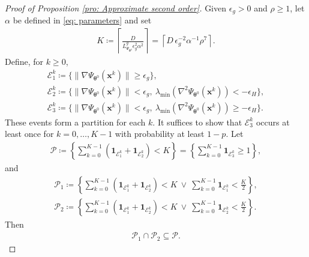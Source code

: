 \documentclass{siamart251216}
\begin{document}
\begin{proof}[Proof of Proposition \ref{pro: Approximate second order}]
    Given $\epsilon_g>0$ and $\rho\geq1$, let $\alpha$ be defined in \eqref{eq: parameters} and set
    \begin{gather}
        \label{eq: K}
        K\coloneqq
        \left\lceil
        \frac{D}{L_{\Psi_{\boldsymbol{\theta}^{0}}}^{g}\epsilon_g^{2}\alpha^{2}}
        \right\rceil
        =
        \left\lceil
        D\,\epsilon_g^{-2}\alpha^{-1}\rho^{7}
        \right\rceil .
    \end{gather}
    Define, for $k\geq0$,
    \begin{gather*}
        \mathcal{E}_{1}^{k}\coloneqq
        \{\|\nabla\Psi_{\boldsymbol{\theta}^{0}}(\mathbf{x}^{k})\|\geq\epsilon_g\},\\
        \mathcal{E}_{2}^{k}\coloneqq
        \{\|\nabla\Psi_{\boldsymbol{\theta}^{0}}(\mathbf{x}^{k})\|<\epsilon_g,\ 
        \lambda_{\min}(\nabla^{2}\Psi_{\boldsymbol{\theta}^{0}}(\mathbf{x}^{k}))<-\epsilon_H\},\\
        \mathcal{E}_{3}^{k}\coloneqq
        \{\|\nabla\Psi_{\boldsymbol{\theta}^{0}}(\mathbf{x}^{k})\|<\epsilon_g,\ 
        \lambda_{\min}(\nabla^{2}\Psi_{\boldsymbol{\theta}^{0}}(\mathbf{x}^{k}))\geq-\epsilon_H\}.
    \end{gather*}
    These events form a partition for each $k$. It suffices to show that $\mathcal{E}_{3}^{k}$ occurs at least once for $k=0,\ldots,K-1$ with probability at least $1-p$. Let
    \begin{gather}
        \label{eq: Event P}
        \mathcal{P}\coloneqq
        \left\{\sum_{k=0}^{K-1}
        \left(\mathbf{1}_{\mathcal{E}_{1}^{k}}+\mathbf{1}_{\mathcal{E}_{2}^{k}}\right)<K\right\}
        =
        \left\{\sum_{k=0}^{K-1}\mathbf{1}_{\mathcal{E}_{3}^{k}}\geq1\right\},
    \end{gather}
    and
    \begin{gather*}
        \mathcal{P}_{1}\coloneqq
        \left\{
        \sum_{k=0}^{K-1}\left(\mathbf{1}_{\mathcal{E}_{1}^{k}}+\mathbf{1}_{\mathcal{E}_{2}^{k}}\right)<K
        \ \lor\
        \sum_{k=0}^{K-1}\mathbf{1}_{\mathcal{E}_{1}^{k}}<\frac{K}{2}
        \right\},\\
        \mathcal{P}_{2}\coloneqq
        \left\{
        \sum_{k=0}^{K-1}\left(\mathbf{1}_{\mathcal{E}_{1}^{k}}+\mathbf{1}_{\mathcal{E}_{2}^{k}}\right)<K
        \ \lor\
        \sum_{k=0}^{K-1}\mathbf{1}_{\mathcal{E}_{2}^{k}}<\frac{K}{2}
        \right\}.
    \end{gather*}
    Then
    \begin{gather}
        \label{eq: P1 and P2 to P}
        \mathcal{P}_{1}\cap\mathcal{P}_{2}\subseteq\mathcal{P}.
    \end{gather}


\end{proof}
\end{document}
